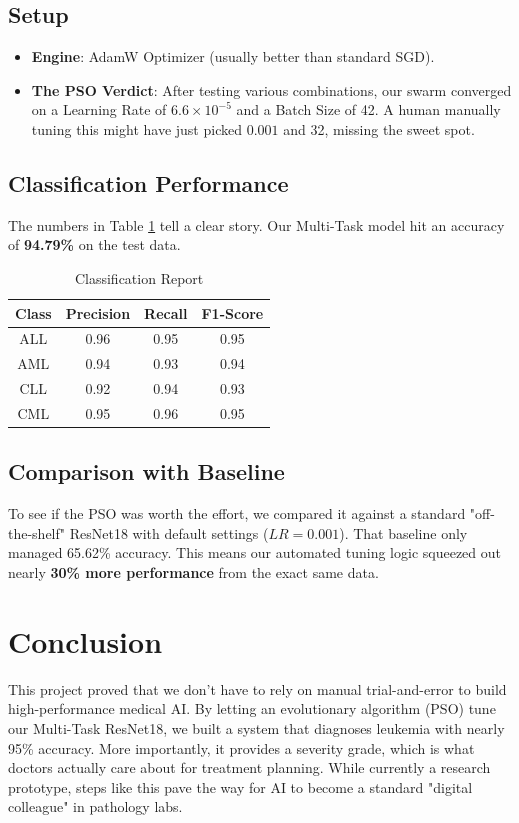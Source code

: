 \documentclass[conference]{IEEEtran}
\begin{document}
\subsection{Setup}
\begin{itemize}
    \item \textbf{Engine}: AdamW Optimizer (usually better than standard SGD).
    \item \textbf{The PSO Verdict}: After testing various combinations, our swarm converged on a Learning Rate of $6.6 \times 10^{-5}$ and a Batch Size of 42. A human manually tuning this might have just picked $0.001$ and 32, missing the sweet spot.
\end{itemize}

\subsection{Classification Performance}
The numbers in Table \ref{tab1} tell a clear story. Our Multi-Task model hit an accuracy of \textbf{94.79\%} on the test data.

\begin{table}[htbp]
\caption{Classification Report}
\begin{center}
\begin{tabular}{|c|c|c|c|}
\hline
\textbf{Class} & \textbf{Precision} & \textbf{Recall} & \textbf{F1-Score} \\
\hline
ALL & 0.96 & 0.95 & 0.95 \\
AML & 0.94 & 0.93 & 0.94 \\
CLL & 0.92 & 0.94 & 0.93 \\
CML & 0.95 & 0.96 & 0.95 \\
\hline
\end{tabular}
\label{tab1}
\end{center}
\end{table}

\subsection{Comparison with Baseline}
To see if the PSO was worth the effort, we compared it against a standard "off-the-shelf" ResNet18 with default settings ($LR=0.001$). That baseline only managed 65.62\% accuracy. This means our automated tuning logic squeezed out nearly \textbf{30\% more performance} from the exact same data.

\section{Conclusion}
This project proved that we don't have to rely on manual trial-and-error to build high-performance medical AI. By letting an evolutionary algorithm (PSO) tune our Multi-Task ResNet18, we built a system that diagnoses leukemia with nearly 95\% accuracy. More importantly, it provides a severity grade, which is what doctors actually care about for treatment planning. While currently a research prototype, steps like this pave the way for AI to become a standard "digital colleague" in pathology labs.
\end{document}

